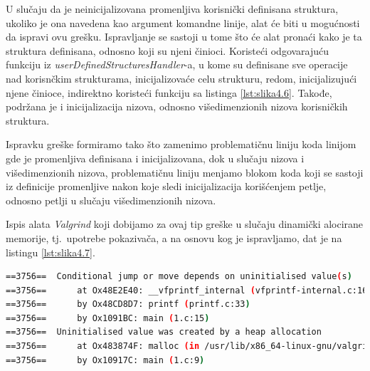 \documentclass[12pt,oneside]{memoir}
\theoremstyle{plain}
\theoremstyle{definition}
\begin{document}

U slučaju da je neinicijalizovana promenljiva korisnički definisana struktura, ukoliko je ona navedena kao argument komandne linije, alat će biti u mogućnosti da ispravi ovu grešku. Ispravljanje se sastoji u tome što će alat pronaći kako je ta struktura definisana, odnosno koji su njeni činioci. Koristeći odgovarajuću funkciju iz \textit{userDefinedStructuresHandler}-a, u kome su definisane sve operacije nad korisnčkim strukturama, inicijalizovaće celu strukturu, redom, inicijalizujući njene činioce, indirektno koristeći funkciju sa listinga \ref{lst:slika4.6}. Takođe, podržana je i inicijalizacija nizova, odnosno višedimenzionih nizova korisničkih struktura. 

Ispravku greške formiramo tako što zamenimo problematičnu liniju koda linijom gde je promenljiva definisana i inicijalizovana, dok u slučaju nizova i višedimenzionih nizova, problematičnu liniju menjamo blokom koda koji se sastoji iz definicije promenljive nakon koje sledi inicijalizacija korišćenjem petlje, odnosno petlji u slučaju višedimenzionih nizova. 

Ispis alata \textit{Valgrind} koji dobijamo za ovaj tip greške u slučaju dinamički alocirane memorije, tj.~upotrebe pokazivača, a na osnovu kog je ispravljamo, dat je na listingu \ref{lst:slika4.7}.


\begin{lstlisting}[style=terminal,caption={Ispis greške korišćenja dinamički alocirane neinicijalizovane promenljive (pokazivača)}, label={lst:slika4.7},language={bash}]   
==3756==  Conditional jump or move depends on uninitialised value(s)
==3756==      at Ox48E2E40: __vfprintf_internal (vfprintf-internal.c:1644)
==3756==      by Ox48CD8D7: printf (printf.c:33)
==3756==      by Ox1091BC: main (1.c:15)
==3756==  Uninitialised value was created by a heap allocation
==3756==      at Ox483874F: malloc (in /usr/lib/x86_64-linux-gnu/valgrind/vgpreload_memcheck-amd64-linux.so) 
==3756==      by Ox10917C: main (1.c:9)
\end{lstlisting}
\end{document}
